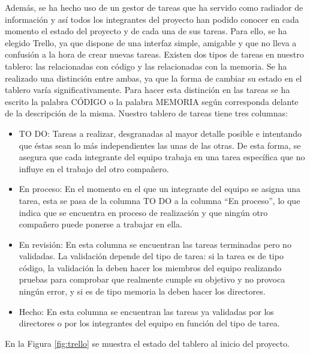 Además, se ha hecho uso de un gestor de tareas que ha servido como radiador de información y así todos los integrantes del proyecto han podido conocer en cada momento el estado del proyecto y de cada una de sus tareas. Para ello, se ha elegido Trello, ya que dispone de una interfaz simple, amigable y que no lleva a confusión a la hora de crear nuevas tareas.
Existen dos tipos de tareas en nuestro tablero: las relacionadas con código y las relacionadas con la memoria. Se ha realizado una distinción entre ambas, ya que la forma de cambiar su estado en el tablero varía significativamente. Para hacer esta distinción en las tareas se ha escrito la palabra CÓDIGO o la palabra MEMORIA según corresponda delante de la descripción de la misma. Nuestro tablero de tareas tiene tres columnas:
\begin{itemize}
	\item TO DO: Tareas a realizar, desgranadas al mayor detalle posible e intentando que éstas sean lo más independientes las unas de las otras. De esta forma, se asegura que cada integrante del equipo trabaja en una tarea específica que no influye en el trabajo del otro compañero.
	
	\item En proceso: En el momento en el que un integrante del equipo se asigna una tarea, esta se pasa de la columna TO DO a la columna ``En proceso'', lo que indica que se encuentra en proceso de realización y que ningún otro compañero puede ponerse a trabajar en ella. 
	
	\item En revisión: En esta columna se encuentran las tareas terminadas pero no validadas. La validación depende del tipo de tarea: si la tarea es de tipo código, la validación la deben hacer los miembros del equipo realizando pruebas para comprobar que realmente cumple su objetivo y no provoca ningún error, y si es de tipo memoria la deben hacer los directores.
	
	\item Hecho: En esta columna se encuentran las tareas ya validadas por los directores o por los integrantes del equipo en función del tipo de tarea.  
	
\end{itemize}

En la Figura \ref{fig:trello} se muestra el estado del tablero al inicio del proyecto.



